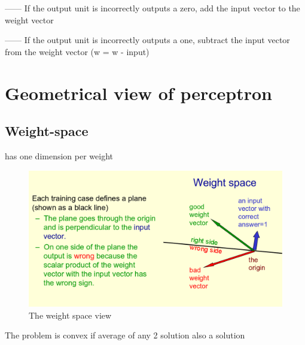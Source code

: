 \documentclass{book}
\begin{document}
------ If the output unit is incorrectly outputs a zero, add the input vector to the weight vector

------ If the output unit is incorrectly outputs a one, subtract the input vector from the weight vector (w = w - input)

\section{Geometrical view of perceptron}

\subsection{Weight-space}
has one dimension per weight

\begin{figure}[h]
\centering
\includegraphics[width=0.7\linewidth]{./figures/weightplane}
\caption{The weight space view}
\label{fig:weightplane}
\end{figure}
 
 The problem is convex if average of any 2 solution also a solution


 
\end{document}
